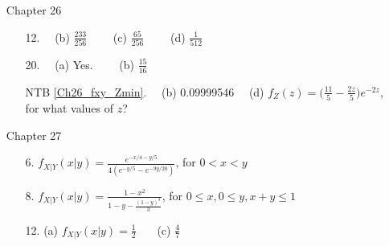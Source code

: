\documentclass[12pt]{article}
\begin{document}
\begin{itemize}
\item[Chapter 26]           \label{ANS_26}
	\begin{itemize}
	\item[12.]   %
	\ \ (b) $ \frac{233}{256}  $ \ \ \ \ (c)  $ \frac{65}{256}  $ \ \ \ \ (d) $ \frac{1}{512}  $
	\item[20.]   \ \  (a)  Yes.  \ \ \ \ (b) $ \frac{15}{16}  $
	\item[NTB \ref{Ch26_fxy_Zmin}.]   \ \ (b) 0.09999546 \ \ (d) $f_Z(z) =\Big(\frac{11}{5} -  \frac{2z}{5}\Big)e^{-2z}$, for what values of $z$?
	\end{itemize}

\item[Chapter 27]           \label{ANS_27} 
	\begin{itemize}
	\item[6.]   $f_{X|Y}(x|y)=\frac{e^{-x/4-y/5}}{4(e^{-y/5}-e^{-9y/20})}$, for $0< x< y$
	\item[8.]   $f_{X|Y}(x|y)=\frac{1-x^2}{1-y-\frac{(1-y)^3}{3}}$, for $0\leq x, 0\leq y, x+y\leq 1$
	\item[12.]   (a) $f_{X|Y}(x|y)=\frac{1}{2}$ \ \ \ (c)  $\frac{4}{7}$
	\end{itemize}





\end{itemize}
\end{document}
